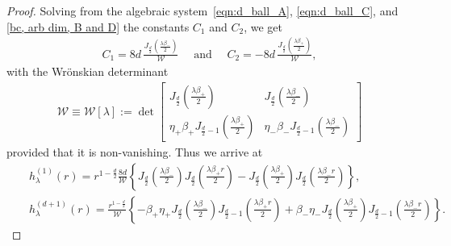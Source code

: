 \documentclass[11pt,a4paper,english,reqno]{amsart}
\theoremstyle{plain}
\newcommand{\1}{\mathbbm{1}}
\begin{document}
\begin{proof}
Solving from the algebraic system~\eqref{eqn:d_ball_A},  \eqref{eqn:d_ball_C}, and \eqref{bc, arb dim, B and D} the constants $C_1$ and $C_2$, we get
\begin{align*}
C_1 = 8d\,\frac{ J_{\frac{d}{2}}\left(\frac{\lambda\beta_-}{2}\right)}{\mathcal{W}}\quad\text{ and }\quad C_2 = -8d\, \frac{ J_{\frac{d}{2}}\left(\frac{\lambda\beta_+}{2}\right)}{\mathcal{W}},
\end{align*}
with the Wr\"{o}nskian determinant
\begin{align}\label{wronskian, arb dim}
\mathcal{W} \equiv \mathcal{W}[\lambda] :=  \det\begin{bmatrix} 
J_{\frac{d}{2}}\left(\frac{\lambda\beta_+}{2}\right)  & J_{\frac{d}{2}}\left(\frac{\lambda\beta_-}{2}\right)\\
\eta_+\beta_+ J_{\frac{d}{2}-1}\left(\frac{\lambda\beta_+}{2}\right) & \eta_-\beta_- J_{\frac{d}{2}-1}\left(\frac{\lambda\beta_-}{2}\right)
\end{bmatrix}
\end{align}
provided that it is non-vanishing. Thus we arrive at
\begin{eqnarray}
&&h^{(1)}_\lambda(r) = r^{1-\frac{d}{2}}\frac{8d}{{\mathcal{W}}} \left\{J_{\frac{d}{2}}\left(\frac{\lambda\beta_-}{2}\right) J_{\frac{d}{2}}\left( \frac{\lambda  \beta_+ r}{2}\right) - J_{\frac{d}{2}}\left(\frac{\lambda\beta_+}{2}\right) J_{\frac{d}{2}}\left( \frac{\lambda \beta_- r}{2}\right)\right\},\label{B, sol, arb dim}\\
&&h^{(d+1)}_\lambda(r) = \frac{r^{1-\frac{d}{2}}}{{\mathcal{W}}} \left\{-\beta_+\eta_+   J_{\frac{d}{2}}\left(\frac{\lambda\beta_-}{2}\right) J_{\frac{d}{2}-1} \left( \frac{\lambda \beta_+ r}{2}\right) +\beta_-\eta_-  J_{\frac{d}{2}}\left(\frac{\lambda\beta_+}{2}\right) J_{\frac{d}{2}-1}\left( \frac{\lambda \beta_- r}{2}\right)\right\}.\label{D, sol, arb dim}
\end{eqnarray}


\end{proof}
\end{document}
